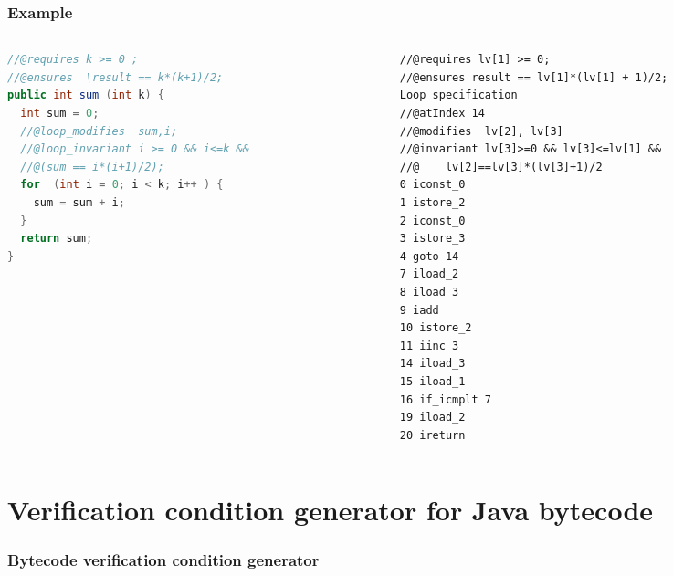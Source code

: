 \documentclass{beamer}
\begin{document}
%      


\begin{frame}\frametitle{Example}
\begin{columns}
\begin{column}{5.1cm}
{\tiny
\begin{lstlisting}[language=java]
//@requires k >= 0 ;
//@ensures  \result == k*(k+1)/2;
public int sum (int k) {
  int sum = 0;		
  //@loop_modifies  sum,i;
  //@loop_invariant i >= 0 && i<=k && 
  //@(sum == i*(i+1)/2);
  for  (int i = 0; i < k; i++ ) {
    sum = sum + i;
  } 	
  return sum;
}
\end{lstlisting}}
\end{column}

\begin{column}{5.1cm}
{\tiny
\begin{lstlisting}[language=jvmis]
//@requires lv[1] >= 0;
//@ensures result == lv[1]*(lv[1] + 1)/2;
Loop specification
//@atIndex 14 
//@modifies  lv[2], lv[3]
//@invariant lv[3]>=0 && lv[3]<=lv[1] &&
//@    lv[2]==lv[3]*(lv[3]+1)/2
0 iconst_0
1 istore_2
2 iconst_0
3 istore_3
4 goto 14 
7 iload_2
8 iload_3
9 iadd
10 istore_2 
11 iinc 3 
14 iload_3
15 iload_1
16 if_icmplt 7 
19 iload_2
20 ireturn
\end{lstlisting}}
\end{column}
\end{columns}
\end{frame}

\section{Verification condition generator for Java bytecode}
\begin{frame}\frametitle{Bytecode verification condition generator}
\begin{center}

\end{center}
\end{frame} 
\end{document}
